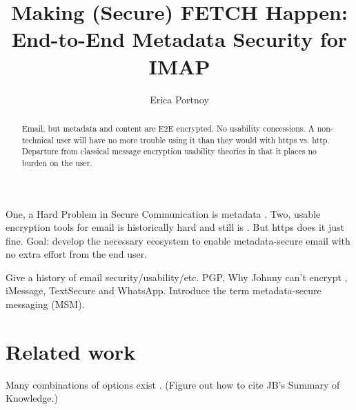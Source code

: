 \documentclass[pageno]{jpaper}
\newcommand{\project}{IMAPSec }
\begin{document}
\title{Making (Secure) FETCH Happen:
\\ \vspace{2 mm} {\large End-to-End Metadata Security for IMAP}}


\author{Erica Portnoy}

\date{}
\maketitle

\thispagestyle{empty}

\tableofcontents

\begin{abstract}
Email, but metadata and content are E2E encrypted. No usability concessions. A non-technical user will have no more trouble using it than they would with https vs. http. Departure from classical message encryption usability theories in that it places no burden on the user.
\end{abstract}





One, a Hard Problem in Secure Communication is metadata \cite{hardprob}. Two, usable encryption tools for email is historically hard and still is \cite{johnny}. But https does it just fine. Goal: develop the necessary ecosystem to enable metadata-secure email with no extra effort from the end user.

Give a history of email security/usability/etc. PGP, Why Johnny can't encrypt \cite{johnny}, iMessage, TextSecure and WhatsApp. Introduce the term metadata-secure messaging (MSM).

\section{Related work}
Many combinations of options exist \cite{spreadsheet}. (Figure out how to cite JB's Summary of Knowledge.)
\end{document}
